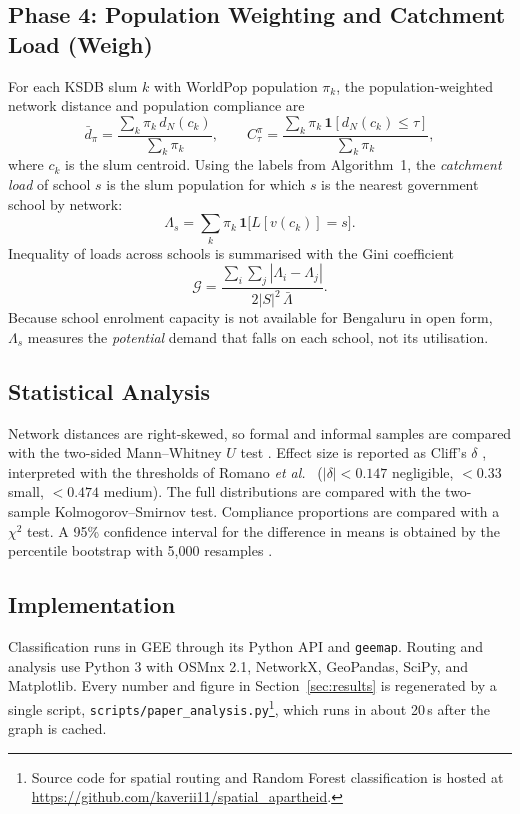 \documentclass[conference]{IEEEtran}
\begin{document}
\subsection{Phase 4: Population Weighting and Catchment Load (Weigh)}
For each KSDB slum $k$ with WorldPop population $\pi_k$, the population-weighted network distance and population compliance are
\begin{equation}
\bar d_\pi=\frac{\sum_k \pi_k\, d_N(c_k)}{\sum_k \pi_k},\qquad
C^\pi_\tau=\frac{\sum_k \pi_k\,\mathbf{1}[d_N(c_k)\le\tau]}{\sum_k \pi_k},
\end{equation}
where $c_k$ is the slum centroid. Using the labels from Algorithm~1, the \emph{catchment load} of school $s$ is the slum population for which $s$ is the nearest government school by network:
\begin{equation}
\Lambda_s=\sum_k \pi_k\,\mathbf{1}\big[L[v(c_k)]=s\big].
\end{equation}
Inequality of loads across schools is summarised with the Gini coefficient
\begin{equation}
\mathcal{G}=\frac{\sum_{i}\sum_{j}|\Lambda_i-\Lambda_j|}{2|S|^2\,\bar\Lambda}.
\end{equation}
Because school enrolment capacity is not available for Bengaluru in open form, $\Lambda_s$ measures the \emph{potential} demand that falls on each school, not its utilisation.

\subsection{Statistical Analysis}
Network distances are right-skewed, so formal and informal samples are compared with the two-sided Mann--Whitney $U$ test \cite{mann1947}. Effect size is reported as Cliff's $\delta$ \cite{cliff1993}, interpreted with the thresholds of Romano \textit{et al.}\ \cite{romano2006} ($|\delta|<0.147$ negligible, $<0.33$ small, $<0.474$ medium). The full distributions are compared with the two-sample Kolmogorov--Smirnov test. Compliance proportions are compared with a $\chi^2$ test. A 95\% confidence interval for the difference in means is obtained by the percentile bootstrap with 5,000 resamples \cite{efron1993}.

\subsection{Implementation}
Classification runs in GEE through its Python API and \texttt{geemap}. Routing and analysis use Python 3 with OSMnx 2.1, NetworkX, GeoPandas, SciPy, and Matplotlib. Every number and figure in Section~\ref{sec:results} is regenerated by a single script, \texttt{scripts/paper\_analysis.py}\footnote{Source code for spatial routing and Random Forest classification is hosted at \url{https://github.com/kaverii11/spatial_apartheid}.}, which runs in about 20\,s after the graph is cached.
\end{document}
